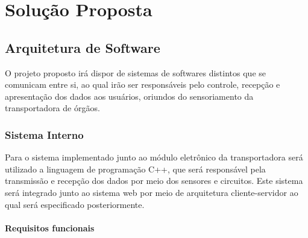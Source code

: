 \chapter[Solução Proposta]{Solução Proposta}

\section{Arquitetura de Software}
O projeto proposto irá dispor de sistemas de softwares distintos que se comunicam entre si, ao qual irão ser responsáveis pelo controle, recepção e apresentação dos dados aos usuários, oriundos do sensoriamento da transportadora de órgãos.

\subsection{Sistema Interno}

Para o sistema implementado junto ao módulo eletrônico da transportadora será utilizado a linguagem de programação C++, que será responsável pela transmissão e recepção dos dados por meio dos sensores e circuitos. 
Este sistema será integrado junto ao sistema web por meio de arquitetura cliente-servidor ao qual será especificado posteriormente.

\subsubsection{Requisitos funcionais}

